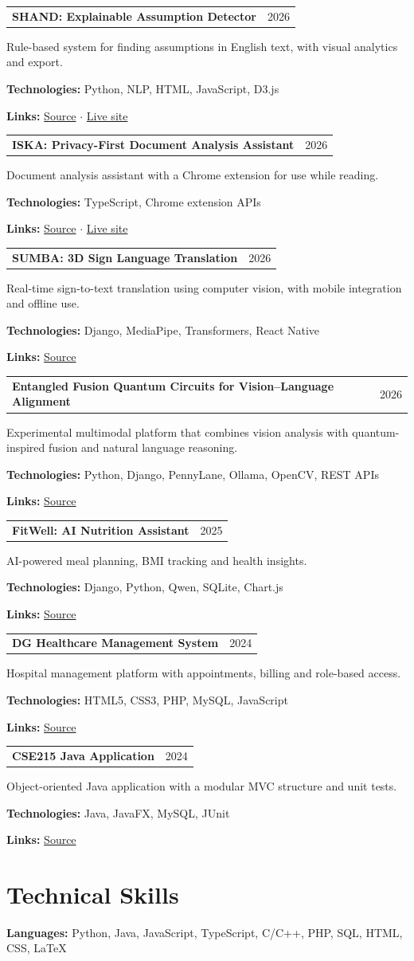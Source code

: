 \documentclass[10pt,letterpaper]{article}
\makeatletter
\newcommand{\entryhead}[2]{\par\needspace{4\baselineskip}\vspace{4pt}\noindent%
  \begin{tabular*}{\textwidth}[t]{@{}>{\raggedright\arraybackslash}p{0.72\textwidth}@{\extracolsep{\fill}}r@{}}
    \textbf{#1} & #2
  \end{tabular*}\par\vspace{1pt}}
\newcommand{\entryplain}[2]{\entryhead{#1}{#2}}
\newcommand{\tech}[1]{\par\vspace{2pt}\noindent\textbf{Technologies:} #1\par}
\newcommand{\links}[1]{\par\vspace{2pt}\noindent\textbf{Links:} #1\par}
\newcommand{\gap}{\par\vspace{7pt}}
\let\origsection\section
\renewcommand{\section}[1]{\needspace{7\baselineskip}\origsection{#1}}
\makeatother
\begin{document}
\entryplain{SHAND: Explainable Assumption Detector}{2026}
Rule-based system for finding assumptions in English text, with visual analytics and export.
\tech{Python, NLP, HTML, JavaScript, D3.js}
\links{\href{https://github.com/minhaz-42/SHAND}{Source} $\cdot$ \href{https://shand1.vercel.app/}{Live site}}
\gap

\entryplain{ISKA: Privacy-First Document Analysis Assistant}{2026}
Document analysis assistant with a Chrome extension for use while reading.
\tech{TypeScript, Chrome extension APIs}
\links{\href{https://github.com/minhaz-42/ISKA}{Source} $\cdot$ \href{https://iska-hxrr.vercel.app/}{Live site}}
\gap

\entryplain{SUMBA: 3D Sign Language Translation}{2026}
Real-time sign-to-text translation using computer vision, with mobile integration and offline use.
\tech{Django, MediaPipe, Transformers, React Native}
\links{\href{https://github.com/minhaz-42/SUMBA}{Source}}
\gap

\entryplain{Entangled Fusion Quantum Circuits for Vision--Language Alignment}{2026}
Experimental multimodal platform that combines vision analysis with quantum-inspired fusion and
natural language reasoning.
\tech{Python, Django, PennyLane, Ollama, OpenCV, REST APIs}
\links{\href{https://github.com/minhaz-42/Entangled-Fusion-Quantum-Circuits-for-Vision-Language-Representation-Alignment}{Source}}
\gap

\entryplain{FitWell: AI Nutrition Assistant}{2025}
AI-powered meal planning, BMI tracking and health insights.
\tech{Django, Python, Qwen, SQLite, Chart.js}
\links{\href{https://github.com/minhaz-42/FitWell-Using-Django}{Source}}
\gap

\entryplain{DG Healthcare Management System}{2024}
Hospital management platform with appointments, billing and role-based access.
\tech{HTML5, CSS3, PHP, MySQL, JavaScript}
\links{\href{https://github.com/minhaz-42/cse311-project-on---DG-health-care-management-system-using-html-css-php}{Source}}
\gap

\entryplain{CSE215 Java Application}{2024}
Object-oriented Java application with a modular MVC structure and unit tests.
\tech{Java, JavaFX, MySQL, JUnit}
\links{\href{https://github.com/minhaz-42/cse215-project-using-java}{Source}}

\section{Technical Skills}
\textbf{Languages:} Python, Java, JavaScript, TypeScript, C/C++, PHP, SQL, HTML, CSS, LaTeX
\end{document}
